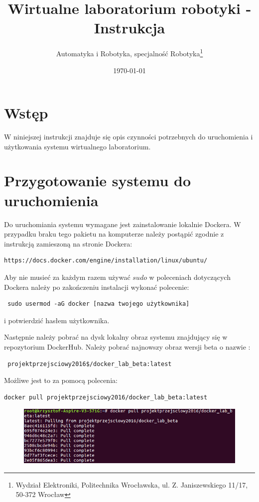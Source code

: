 \documentclass[10pt, a4paper]{article}
\author{Automatyka i Robotyka, specjalność Robotyka\footnote{Wydział Elektroniki, Politechnika Wrocławska, ul. Z. Janiszewskiego 11/17, 50-372 Wrocław} }
\title{ Wirtualne laboratorium robotyki - Instrukcja }
\date{\today}
\begin{document}
\maketitle %
%
\def\tablename{Tabela}
%

\section{Wstęp}
\label{sec:wstep} %
W niniejszej instrukcji znajduje się opis czynności potrzebnych do uruchomienia i użytkowania systemu wirtualnego laboratorium.

\section{Przygotowanie systemu do uruchomienia}
\label{sec:przygotowanie}
Do uruchomiania systemu wymagane jest zainstalowanie lokalnie Dockera. W przypadku braku tego pakietu na komputerze należy postąpić zgodnie z instrukcją zamieszoną na stronie Dockera:

\begin{verbatim}
https://docs.docker.com/engine/installation/linux/ubuntu/
\end{verbatim}


Aby nie musieć za każdym razem używać $sudo$ w poleceniach dotyczących Dockera należy po zakończeniu instalacji wykonać polecenie:
\begin{verbatim}
 sudo usermod -aG docker [nazwa twojego użytkownika] 
\end{verbatim}

i potwierdzić hasłem użytkownika. 

Następnie należy pobrać na dysk lokalny obraz systemu znajdujący się w repozytorium DockerHub. Należy pobrać najnowszy obraz wersji beta o nazwie :
\begin{verbatim}
 projektprzejsciowy2016$/docker_lab_beta:latest
\end{verbatim}

Możliwe jest to za pomocą polecenia:
\begin{verbatim}
docker pull projektprzejsciowy2016/docker_lab_beta:latest
\end{verbatim}


\begin{figure}[hbt]
  \setlength{\unitlength}{1.0cm}
  \centering 
  
    \includegraphics[width=12 cm]{./grafika/pull.png}
 
\end{figure}
\end{document}
